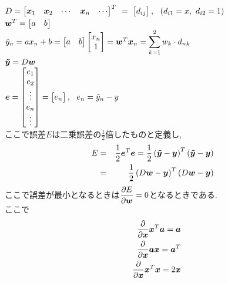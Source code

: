 \documentclass[dvipdfmx,a4j]{jsarticle}
\begin{document}
        $D = \begin{bmatrix}\mbox{\boldmath $x$}_{1}&\mbox{\boldmath $x$}_{2}&\cdots&\mbox{\boldmath $x$}_{n} &\cdots \end{bmatrix}^{T}\ =\ \begin{bmatrix}d_{ij}\end{bmatrix},\ \ (d_{i1}=x,\ d_{i2}=1)$\\
        $\mbox{\boldmath $w$}^{T} = \begin{bmatrix} a&b \end{bmatrix}$\\
        $\tilde{y}_{n} = ax_{n}+b = \begin{bmatrix} a&b \end{bmatrix} \begin{bmatrix} x_{n}\\1 \end{bmatrix}=\mbox{\boldmath $w$}^{T}\mbox{\boldmath $x$}_{n} = \displaystyle \sum_{k=1}^{2}w_{k}\cdot d_{nk}$\\
        $\mbox{\boldmath $\tilde{y}$} = D\mbox{\boldmath $w$}$\\
        $\mbox{\boldmath $e$}=\begin{bmatrix}e_{1}\\e_{2}\\\vdots \\ e_{n}\\ \vdots \end{bmatrix}=\begin{bmatrix}e_{n}\end{bmatrix},\ \ e_{n}=\tilde{y}_{n}-y$\\
        ここで誤差$E$は二乗誤差の$\displaystyle \frac{1}{2}$倍したものと定義し,
        \begin{eqnarray*}
          E&=&\frac{1}{2}\mbox{\boldmath $e$}^{T} \mbox{\boldmath $e$} = \frac{1}{2}\left(\mbox{\boldmath $\tilde{y}$} -\mbox{\boldmath $y$} \right)^{T}\left(\mbox{\boldmath $\tilde{y}$} -\mbox{\boldmath $y$} \right)\\
          &=&\frac{1}{2}\left(D\mbox{\boldmath $w$}-\mbox{\boldmath $y$}\right)^{T}\left(D\mbox{\boldmath $w$}-\mbox{\boldmath $y$}\right)
        \end{eqnarray*}
        ここで誤差が最小となるときは$\displaystyle \frac{\partial E}{\partial \mbox{\boldmath $w$}}=0$となるときである.\\
        ここで
        \begin{eqnarray*}
          &&\frac{\partial}{\partial \mbox{\boldmath $x$}} \mbox{\boldmath $x$}^{T}\mbox{\boldmath $a$} = \mbox{\boldmath $a$}\\
          &&\frac{\partial}{\partial \mbox{\boldmath $x$}} \mbox{\boldmath $a$}\mbox{\boldmath $x$} = \mbox{\boldmath $a$}^{T}\\
          &&\frac{\partial}{\partial \mbox{\boldmath $x$}}\mbox{\boldmath $x$}^{T}\mbox{\boldmath $x$}=2\mbox{\boldmath $x$}
        \end{eqnarray*}
\end{document}
